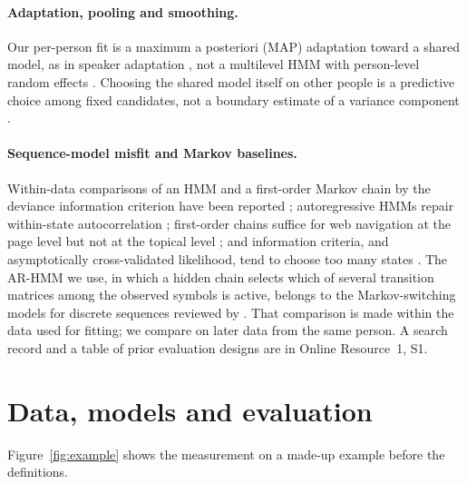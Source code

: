 \documentclass[pdflatex,sn-basic]{sn-jnl}
\newcommand{\Sref}[1]{Online Resource~1, S#1}
\begin{document}
\paragraph{Adaptation, pooling and smoothing.}
Our per-person fit is a maximum a posteriori (MAP) adaptation toward a shared model, as in speaker adaptation \citep{Gauvain1994,Reynolds2000}, not a multilevel HMM with person-level random effects \citep{Altman2007,AartsHaslbeck2025}. Choosing the shared model itself on other people is a predictive choice among fixed candidates, not a boundary estimate of a variance component \citep{MorrisLysy2012,Chung2013}.

\paragraph{Sequence-model misfit and Markov baselines.}
Within-data comparisons of an HMM and a first-order Markov chain by the deviance information criterion have been reported \citep{Shirley2010}; autoregressive HMMs repair within-state autocorrelation \citep{Stoye2025}; first-order chains suffice for web navigation at the page level but not at the topical level \citep{Singer2014}; and information criteria, and asymptotically cross-validated likelihood, tend to choose too many states \citep{Pohle2017}.
The AR-HMM we use, in which a hidden chain selects which of several transition matrices among the observed symbols is active, belongs to the Markov-switching models for discrete sequences reviewed by \citet{BerchtoldRaftery2002}.
That comparison is made within the data used for fitting; we compare on later data from the same person. A search record and a table of prior evaluation designs are in \Sref{1}.

\section{Data, models and evaluation}\label{sec:methods}

Figure~\ref{fig:example} shows the measurement on a made-up example before the definitions.
\end{document}
